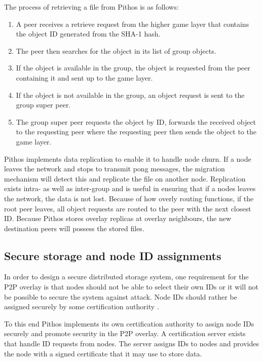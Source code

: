\documentclass[10pt,a4paper,conference]{IEEEtran}
\begin{document}
The process of retrieving a file from Pithos is as follows:
\begin{enumerate}
\item A peer receives a retrieve request from the higher game layer that contains the object ID generated from the SHA-1 hash.
\item The peer then searches for the object in its list of group objects.
\item If the object is available in the group, the object is requested from the peer containing it and sent up to the game layer.
\item If the object is not available in the group, an object request is sent to the group super peer.
\item The group super peer requests the object by ID, forwards the received object to the requesting peer where the requesting peer then sends
    the object to the game layer.
\end{enumerate}

Pithos implements data replication to enable it to handle node churn. If a node leaves the network and stops to transmit pong messages, the migration
mechanism will detect this and replicate the file on another node. Replication exists intra- as well as inter-group and is useful in ensuring that if
a nodes leaves the network, the data is not lost. Because of how overly routing functions, if the root peer leaves, all object requests are routed to
the peer with the next closest ID. Because Pithos stores overlay replicas at overlay neighbours, the new destination peers will possess the stored
files.

\subsection{Secure storage and node ID assignments}
\label{secure_ids}

In order to design a secure distributed storage system, one requirement for the P2P overlay is that nodes should not be able to select their own IDs
or it will not be possible to secure the system against attack. Node IDs should rather be assigned securely by some certification authority
\cite{secure_overlay_routing}.

To this end Pithos implements its own certification authority to assign node IDs securely and promote security in the P2P overlay. A certification
server exists that handle ID requests from nodes. The server assigns IDs to nodes and provides the node with a signed certificate that it may use to
store data.
\end{document}
